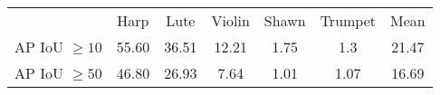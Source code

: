 \begin{tabular}{c|c|c|c|c|c||c}\hline
		& Harp & Lute & Violin & Shawn & Trumpet & Mean\\ 
	AP IoU $\geq10$ & 55.60         & 36.51      & 12.21           & 1.75 & 1.3   &  21.47  \\
	AP IoU $\geq50$ & 46.80         &  26.93    &  7.64          &  1.01       & 1.07 & 16.69 
\end{tabular}
